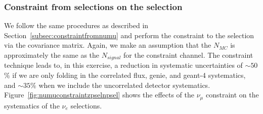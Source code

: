 \subsubsection{Constraint from \numu selections on the \zpsel selection}
\label{subsec:zpselconstraint}

\par We follow the same procedures as described in Section~\ref{subsec:constraintfromnumu} and perform the \numu constraint to the \zpsel selection via the covariance matrix. Again, we make an assumption that the $N_{MC}$ is approximately the same as the $N_{signal}$ for the \numu constraint channel. The constraint technique leads to, in this exercise, a reduction in systematic uncertainties of $\sim50$\% if we are only folding in the correlated flux, genie, and geant-4 systematics, and $\sim35$\% when we include the uncorrelated detector systematics.
Figure~\ref{fig:numuconstraintzpselnpsel} shows the effects of the $\nu_\mu$ constraint on the systematics of the \zpsel $\nu_e$ selections.

